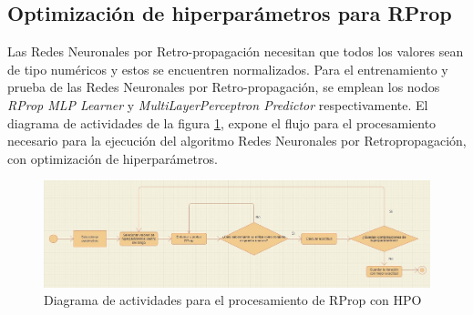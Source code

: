 \subsection{Optimización de hiperparámetros para RProp}
Las Redes Neuronales por Retro-propagación necesitan que todos los valores sean de tipo numéricos y estos se encuentren normalizados. Para el entrenamiento y prueba de las Redes Neuronales por Retro-propagación, se emplean los nodos \textit{RProp MLP Learner} y \textit{MultiLayerPerceptron Predictor} respectivamente.
El diagrama de actividades de la figura \ref{fig:diagrama-act-proc-rprop-hpo}, expone el flujo para el procesamiento necesario para la ejecución del algoritmo Redes Neuronales por Retropropagación, con optimización de hiperparámetros.
\begin{figure}[H]
	\centering
	\includegraphics[width=0.7\linewidth]{"figuras/capi 2/diagrama-act-proc-rprop-hpo"}
	\caption{Diagrama de actividades para el procesamiento de RProp con HPO}
	\label{fig:diagrama-act-proc-rprop-hpo}
\end{figure}

